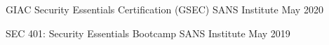 

\begin{cvhonors}

  \cvhonor
    {GIAC Security Essentials Certification (GSEC)} %
    {SANS Institute} %
    {} %
    {May 2020} %

 \cvhonor
    {SEC 401: Security Essentials Bootcamp}
    {SANS Institute}
    {}
    {May 2019}
    

\end{cvhonors}
